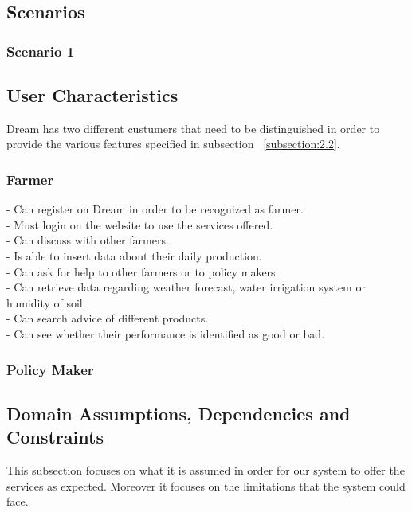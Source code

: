 \documentclass{article}
\begin{document}
\subsection{Scenarios}
\subsubsection{Scenario 1}


\subsection{User Characteristics}
Dream has two different custumers that need to be 
distinguished in order to provide the various 
features specified in subsection ~\ref{subsection:2.2}.
\subsubsection{Farmer}
- Can register on Dream in order to be recognized as farmer.\\
- Must login on the website to use the services offered.\\
- Can discuss with other farmers.\\
- Is able to insert data about their daily production. \\
- Can ask for help to other farmers or to policy makers.\\
- Can retrieve data regarding weather forecast, water irrigation system or humidity of soil.\\
- Can search advice of different products.\\
- Can see whether their performance is identified as good or bad.
\subsubsection{Policy Maker}



\subsection{Domain Assumptions, Dependencies and Constraints}
This subsection focuses on what it is assumed in order for our system to offer the services as expected.
Moreover it focuses on the limitations that the system could face.
\end{document}
